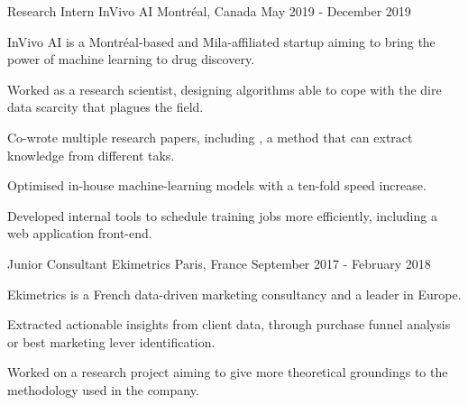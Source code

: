 


\begin{cventries}

    \cventry
    {Research Intern} %
    {InVivo AI} %
    {Montréal, Canada} %
    {May 2019 - December 2019} %
    {
        InVivo AI is a Montréal-based and Mila-affiliated startup aiming to bring the power of machine learning to drug discovery.
        \vspace{4.5mm}
        \begin{cvitems} %
          \item Worked as a research scientist, designing algorithms able to cope with the dire data scarcity that plagues the field.
          \item Co-wrote multiple research papers, including , a method that can extract knowledge from different taks.
          \item Optimised in-house machine-learning models with a ten-fold speed increase.
          \item Developed internal tools to schedule training jobs more efficiently, including a web application front-end.
        \end{cvitems}
    }

    \cventry
    {Junior Consultant} %
    {Ekimetrics} %
    {Paris, France} %
    {September 2017 - February 2018} %
    {
        Ekimetrics is a French data-driven marketing consultancy and a leader in Europe.
        \vspace{4.5mm}
        \begin{cvitems} %
            \item Extracted actionable insights from client data, through purchase funnel analysis or best marketing lever identification.
            \item Worked on a research project aiming to give more theoretical groundings to the methodology used in the company.
        \end{cvitems}
    }


\end{cventries}
